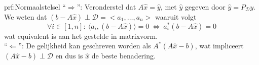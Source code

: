 \begin{prf}[Normaalstelsel]{prf:Normaalstelsel}
    ``$\Rightarrow$'': Veronderstel dat $A\hat{x} = \hat{y}$, met $\hat{y}$ gegeven door $\hat{y} = P_{\mathcal{D}}y$. We weten dat $(b-A\hat{x}) \perp \mathcal{D} = <a_1,\ldots,a_n>$ waaruit volgt
    \begin{equation*}
        \forall i \in [1,n]: \ \langle a_i, (b-A\hat{x}) \rangle = 0 \ \Leftrightarrow \ a_i^*(b-A\hat{x}) = 0 
    \end{equation*}
    wat equivalent is aan het gestelde in matrixvorm. \\

    ``$\Leftarrow$'': De gelijkheid kan geschreven worden als $A^*(A\hat{x}-b)$, wat impliceert $(A\hat{x}-b) \perp \mathcal{D}$ en dus is $\hat{x}$ de beste benadering.
\end{prf}
